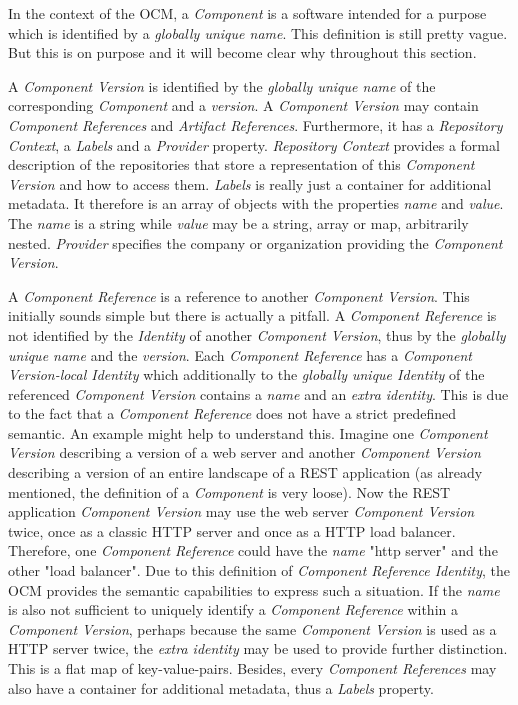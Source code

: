 \noindent In the context of the OCM, a \emph{Component} is a software intended for a purpose which is identified by a \emph{globally unique name}. This definition is still pretty vague. But this is on purpose and it will become clear why throughout this section.\par 
\noindent A \emph{Component Version} is identified by the \emph{globally unique name} of the corresponding \emph{Component} and a \emph{version}. A \emph{Component Version} may contain \emph{Component References} and \emph{Artifact References}. Furthermore, it has a \emph{Repository Context}, a \emph{Labels} and a \emph{Provider} property. \emph{Repository Context} provides a formal description of the repositories that store a representation of this \emph{Component Version} and how to access them. \emph{Labels} is really just a container for additional metadata. It therefore is an array of objects with the properties \emph{name} and \emph{value}. The \emph{name} is a string while \emph{value} may be a string, array or map, arbitrarily nested. \emph{Provider} specifies the company or organization providing the \emph{Component Version}.\par 
\noindent A \emph{Component Reference} is a reference to another \emph{Component Version}. This initially sounds simple but there is actually a pitfall. A \emph{Component Reference} is not identified by the \emph{Identity} of another \emph{Component Version}, thus by the \emph{globally unique name} and the \emph{version}. Each \emph{Component Reference} has a \emph{Component Version-local Identity} which additionally to the \emph{globally unique Identity} of the referenced \emph{Component Version} contains a \emph{name} and an \emph{extra identity}. This is due to the fact that a \emph{Component Reference} does not have a strict predefined semantic. An example might help to understand this. Imagine one \emph{Component Version} describing a version of a web server and another \emph{Component Version} describing a version of an entire landscape of a REST application (as already mentioned, the definition of a \emph{Component} is very loose). Now the REST application \emph{Component Version} may use the web server \emph{Component Version} twice, once as a classic HTTP server and once as a HTTP load balancer. Therefore, one \emph{Component Reference} could have the \emph{name} "http server" and the other "load balancer". Due to this definition of \emph{Component Reference Identity}, the OCM provides the semantic capabilities to express such a situation. If the \emph{name} is also not sufficient to uniquely identify a \emph{Component Reference} within a \emph{Component Version}, perhaps because the same \emph{Component Version} is used as a HTTP server twice, the \emph{extra identity} may be used to provide further distinction. This is a flat map of key-value-pairs. Besides, every \emph{Component References} may also have a container for additional metadata, thus a \emph{Labels} property.\par 
